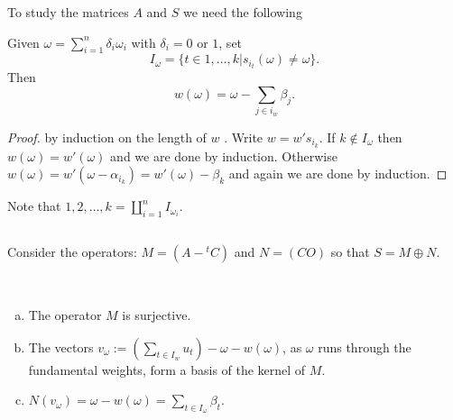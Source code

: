 To study the matrices $A$ and $S$ we need the following

\begin{lemma*}
Given $\omega = \sum_{i=1}^{n}\delta_{i}\omega_{i}$ with $\delta_{i} = 0$ or $1$, set
$$
I_{\omega} = \{t \in {1,\ldots, k} | s_{i_{t}}(\omega) \neq \omega\}.
$$
Then
$$
w(\omega) = \omega - \sum\limits_{j\in i_{w}} \beta_{j}.
$$
\end{lemma*}

\begin{proof}
by induction on the length of $w$ . Write $w=w' s_{i_{k}}$. If $k \not\in I_{\omega}$ then $w(\omega)= w'(\omega)$ and we are done by induction. Otherwise $w(\omega) = w'(\omega-\alpha_{i_{k}}) = w'(\omega)-\beta_{k}$ and again we are done by induction.
\end{proof}

Note that ${1,2,\ldots, k} = \coprod\limits_{i=1}^{n}I_{\omega_{i}}$. 

\subsection{}\label{art4-subsec-3.3}
Consider the operators: $M=(A -{}^{t}C)$ and $N=(C O)$ so that $S= M\oplus N$.

\begin{lemma*}
~
\begin{enumerate}[(a)]
\item The operator $M$ is surjective.\label{art4-enum_l_(a)}
\item The vectors $v_{\omega}:=\left(\sum_{t \in I_{w}} u_{t}\right)-\omega-w(\omega)$, as $\omega$ runs through the fundamental weights, form a basis of the kernel of $M$.\label{art4-enum_l_(b)}
\item $N(v_{\omega}) = \omega - w(\omega) = \sum_{t\in I_{\omega}}\beta_{t}$.\label{art4-enum_l_(c)}
\end{enumerate}
\end{lemma*}

